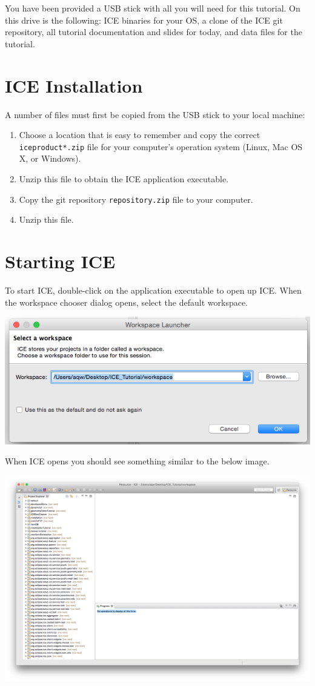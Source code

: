 You have been provided a USB stick with all you will need for this tutorial. On
this drive is the following: ICE binaries for your OS, a clone of the ICE git
repository, all tutorial documentation and slides for today, and
data files for the tutorial. 

\section*{ICE Installation}
A number of files must first be copied from the
USB stick to your local machine:
\begin{enumerate}
\item Choose a location that is easy to remember
and copy the correct \texttt{ice\-product*.zip} file for your computer's 
operation system (Linux, Mac OS X, or Windows).
\item Unzip this file to obtain the 
ICE application executable.
\item Copy the git repository \texttt{repository.zip} file to your computer.
\item Unzip this file.
\end{enumerate}

\section*{Starting ICE}
To start ICE, double-click on the application executable to open up ICE. When the workspace chooser
dialog opens, select the default workspace. 
\begin{center} \includegraphics[width=\textwidth]{figures/workspace}
\end{center}
When ICE opens you should see something similar to the below image. 
\begin{center} \includegraphics[width=\textwidth]{figures/expectedICE}
\end{center} 

